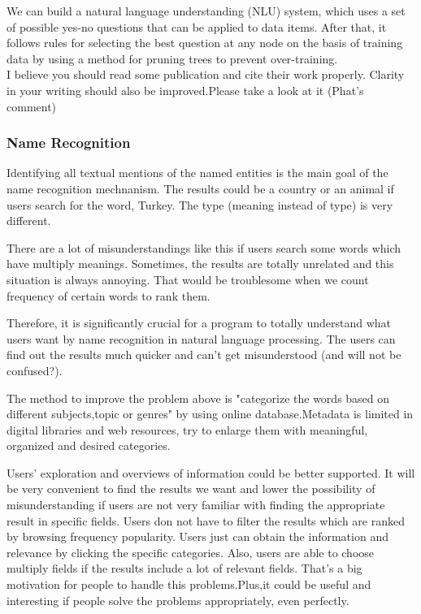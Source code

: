 We can build a natural language understanding (NLU) system, which uses a set of possible yes-no questions that can be applied to data items. After that, it follows rules for selecting the best question at any node on the basis of training data by using a method for pruning trees to prevent over-training.\\ 

I believe you should read some publication and cite their work properly. Clarity in your writing should also be improved.Please take a look at it (Phat's comment)

\subsubsection*{Name Recognition}
Identifying all textual mentions of the named entities is the main goal of the name recognition mechnanism. 
The results could be a country or an animal if users search for the word, Turkey. The type (meaning instead of type) is very different.

There are a lot of misunderstandings like this if users search some words which have multiply meanings. Sometimes, the results are totally unrelated and this situation is always annoying. That would be troublesome when we count frequency of certain words to rank them.
 
Therefore, it is significantly crucial for a program to totally understand what users want by name recognition in natural language processing. The users can find out the results much quicker and can't get misunderstood (and will not be confused?).

The method to improve the problem above is "categorize the words based on different subjects,topic or genres" by using online database.Metadata is limited in digital libraries and web resources, try to enlarge them with meaningful, organized and desired categories.\cite{Kules2006}

Users' exploration and overviews of information could be better supported. It will be very convenient to find the results we want and lower the possibility of misunderstanding if users are not very familiar with finding the appropriate result in specific fields.\cite{TunThuraThet2010} Users don not have to filter the results which are ranked by browsing frequency  popularity. Users just can obtain the information and relevance by clicking the specific categories. Also, users are able to choose multiply fields if the results include a lot of relevant fields. That's a big motivation for people to handle this problems.Plus,it could be useful and interesting if people solve the problems appropriately, even perfectly.  

